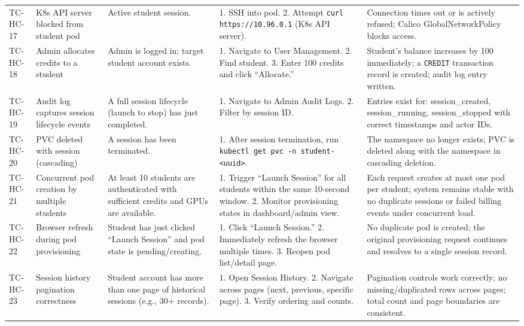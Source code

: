 \documentclass[12pt,a4paper]{article}
\begin{document}
\begin{longtable}{@{}L{2cm}L{3cm}L{3cm}L{3.5cm}L{3cm}@{}}
  TC-HC-17 & K8s API server blocked from student pod & Active student session. & 1. SSH into pod. 2. Attempt \texttt{curl https://10.96.0.1} (K8s API server). & Connection times out or is actively refused; Calico GlobalNetworkPolicy blocks access. \\
    TC-HC-18 & Admin allocates credits to a student & Admin is logged in; target student account exists. & 1. Navigate to User Management. 2. Find student. 3. Enter 100 credits and click ``Allocate.'' & Student's balance increases by 100 immediately; a \texttt{CREDIT} transaction record is created; audit log entry written. \\
  TC-HC-19 & Audit log captures session lifecycle events & A full session lifecycle (launch to stop) has just completed. & 1. Navigate to Admin Audit Logs. 2. Filter by session ID. & Entries exist for: session\_created, session\_running, session\_stopped with correct timestamps and actor IDs. \\
    TC-HC-20 & PVC deleted with session (cascading) & A session has been terminated. & 1. After session termination, run \texttt{kubectl get pvc -n student-<uuid>}. & The namespace no longer exists; PVC is deleted along with the namespace in cascading deletion. \\
  TC-HC-21 & Concurrent pod creation by multiple students & At least 10 students are authenticated with sufficient credits and GPUs are available. & 1. Trigger ``Launch Session'' for all students within the same 10-second window. 2. Monitor provisioning states in dashboard/admin view. & Each request creates at most one pod per student; system remains stable with no duplicate sessions or failed billing events under concurrent load. \\
    TC-HC-22 & Browser refresh during pod provisioning & Student has just clicked ``Launch Session'' and pod state is pending/creating. & 1. Click ``Launch Session.'' 2. Immediately refresh the browser multiple times. 3. Reopen pod list/detail page. & No duplicate pod is created; the original provisioning request continues and resolves to a single session record. \\
  TC-HC-23 & Session history pagination correctness & Student account has more than one page of historical sessions (e.g., 30+ records). & 1. Open Session History. 2. Navigate across pages (next, previous, specific page). 3. Verify ordering and counts. & Pagination controls work correctly; no missing/duplicated rows across pages; total count and page boundaries are consistent. \\

\end{longtable}
\end{document}
